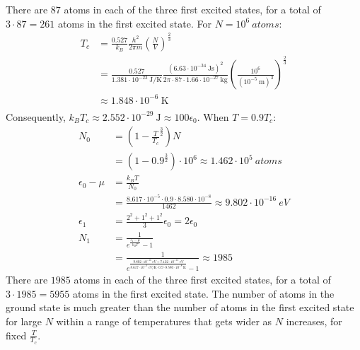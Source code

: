 \documentclass{article}
\begin{document}
There are $87$ atoms in each of the three first excited states, for a total of $3 \cdot 87 = 261$ atoms in the first excited state.
For $N = 10^6~\unit{atoms}$:
\begin{equation}
    \begin{split}
        T_c & = \frac{0.527}{k_B}\frac{h^2}{2\pi m}{\left(\frac{N}{V}\right)}^{\frac{2}{3}} \\
        & = \frac{0.527}{1.381 \cdot 10^{-23}~\unit{\joule\per\kelvin}}\frac{{\left(6.63 \cdot 10^{-34}~\unit{\joule\second}\right)}^2}{2\pi \cdot 87 \cdot 1.66 \cdot 10^{-27}~\unit{\kilo\gram}}{\left(\frac{10^6}{{\left(10^{-5}~\unit{\meter}\right)}^3}\right)}^{\frac{2}{3}} \\
        & \approx 1.848 \cdot 10^{-6}~\unit{\kelvin} \\
    \end{split}
\end{equation}
Consequently, $k_BT_c \approx 2.552 \cdot 10^{-29}~\unit{\joule} \approx 100\epsilon_0$. When $T = 0.9T_c$:
\begin{equation}
    \begin{split}
        N_0 & = \left(1 - \frac{T}{T_c}^{\frac{3}{2}}\right)N \\
        & = \left(1 - 0.9^{\frac{3}{2}}\right) \cdot 10^6 \approx 1.462 \cdot 10^5~\unit{atoms} \\
        \epsilon_0 - \mu & = \frac{k_BT}{N_0} \\
        & = \frac{8.617 \cdot 10^{-5} \cdot 0.9 \cdot 8.580 \cdot 10^{-8}}{1462} \approx 9.802 \cdot 10^{-16}~\unit{eV} \\
        \epsilon_1 & = \frac{2^2 + 1^2 + 1^2}{3}\epsilon_0 = 2\epsilon_0 \\
        N_1 & = \frac{1}{e^{\frac{\epsilon_1 - \mu}{k_BT}} - 1} \\
        & = \frac{1}{e^{\frac{9.802 \cdot 10^{-16}~\unit{eV} + 7.122 \cdot 10^{-14}~\unit{eV}}{8.617 \cdot 10^{-5}~\unit{eV\per\kelvin} \cdot 0.9 \cdot 8.580 \cdot 10^{-8}~\unit{\kelvin} }} - 1} \approx 1985
    \end{split}
\end{equation}
There are $1985$ atoms in each of the three first excited states, for a total of $3 \cdot 1985 = 5955$ atoms in the first excited state. The number of atoms in the ground state is much greater than the number of atoms in the first excited state for large $N$ within a range of temperatures that gets wider as $N$ increases, for fixed $\frac{T}{T_c}$.
\end{document}
